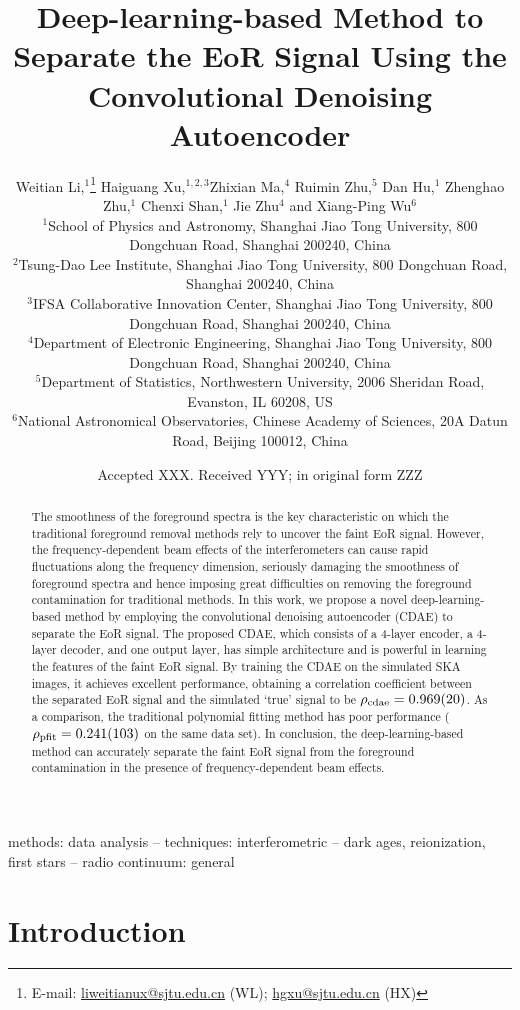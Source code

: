 \documentclass[letters,a4paper,fleqn,usenatbib]{mnras}
\title[EoR Separation with CDAE]{%
  Deep-learning-based Method to Separate the EoR Signal
  Using the Convolutional Denoising Autoencoder
}
\author[Li~et~al.]{%
Weitian Li,$^{1}$\thanks{E-mail:
  \href{mailto:liweitianux@sjtu.edu.cn}{liweitianux@sjtu.edu.cn} (WL);
  \href{mailto:hgxu@sjtu.edu.cn}{hgxu@sjtu.edu.cn} (HX)}
Haiguang Xu,$^{1,2,3}$\footnotemark[1]
Zhixian Ma,$^{4}$
Ruimin Zhu,$^{5}$
Dan Hu,$^{1}$
Zhenghao Zhu,$^{1}$
\newauthor
Chenxi Shan,$^{1}$
Jie Zhu$^{4}$
and
Xiang-Ping Wu$^{6}$
\\
$^{1}${School of Physics and Astronomy,
  Shanghai Jiao Tong University,
  800 Dongchuan Road, Shanghai 200240, China} \\
$^{2}${Tsung-Dao Lee Institute,
  Shanghai Jiao Tong University,
  800 Dongchuan Road, Shanghai 200240, China} \\
$^{3}${IFSA Collaborative Innovation Center,
  Shanghai Jiao Tong University,
  800 Dongchuan Road, Shanghai 200240, China} \\
$^{4}${Department of Electronic Engineering,
  Shanghai Jiao Tong University,
  800 Dongchuan Road, Shanghai 200240, China} \\
$^{5}${Department of Statistics,
  Northwestern University,
  2006 Sheridan Road, Evanston, IL 60208, US} \\
$^{6}${National Astronomical Observatories,
  Chinese Academy of Sciences,
  20A Datun Road, Beijing 100012, China}
}
\date{Accepted XXX. Received YYY; in original form ZZZ}
\newcommand{\R}[1]{\mathrm{#1}}
\begin{document}
\label{firstpage}
\pagerange{\pageref{firstpage}--\pageref{lastpage}}
\maketitle

%
%
\begin{abstract}
The smoothness of the foreground spectra is the key characteristic
on which the traditional foreground removal methods rely to uncover
the faint EoR signal.
However, the frequency-dependent beam effects of the interferometers
can cause rapid fluctuations along the frequency dimension, seriously
damaging the smoothness of foreground spectra and hence imposing
great difficulties on removing the foreground contamination for
traditional methods.
In this work, we propose a novel deep-learning-based method by employing
the convolutional denoising autoencoder (CDAE) to separate the EoR signal.
The proposed CDAE, which consists of a 4-layer encoder, a 4-layer
decoder, and one output layer, has simple architecture and is powerful
in learning the features of the faint EoR signal.
By training the CDAE on the simulated SKA images, it achieves excellent
performance, obtaining a correlation coefficient between
the separated EoR signal and the simulated `true' signal to be
$\rho_{\R{cdae}} = \num{0.969 +- 0.020}$.
As a comparison, the traditional polynomial fitting method has
poor performance
($\rho_{\R{pfit}} = \num{0.241 +- 0.103}$ on the same data set).
In conclusion, the deep-learning-based method can accurately separate
the faint EoR signal from the foreground contamination in the presence
of frequency-dependent beam effects.
\end{abstract}

\begin{keywords}
methods: data analysis --
techniques: interferometric --
dark ages, reionization, first stars --
radio continuum: general
\end{keywords}



\section{Introduction}
\label{sec:intro}
\end{document}
